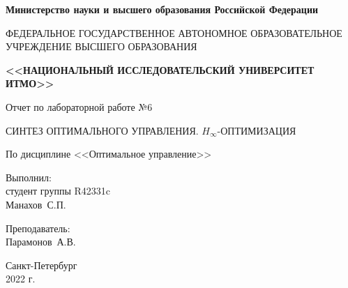 \begin{titlepage}
	\begin{center}
		\begin{small}
			\textbf{Министерство науки и высшего образования Российской Федерации}

			ФЕДЕРАЛЬНОЕ ГОСУДАРСТВЕННОЕ АВТОНОМНОЕ ОБРАЗОВАТЕЛЬНОЕ УЧРЕЖДЕНИЕ ВЫСШЕГО ОБРАЗОВАНИЯ
			
			\textbf{<<НАЦИОНАЛЬНЫЙ ИССЛЕДОВАТЕЛЬСКИЙ УНИВЕРСИТЕТ ИТМО>>}
		\end{small}
		
		\vspace{8em}
		
		Отчет по лабораторной работе №6
		
		СИНТЕЗ ОПТИМАЛЬНОГО УПРАВЛЕНИЯ. $H_\infty$-ОПТИМИЗАЦИЯ
		
		По дисциплине <<Оптимальное управление>>
	\end{center}
	
	\vspace{8em}
	
	\begin{flushright}
		Выполнил:\\
		студент группы R42331c\\
		Манахов~С.П.
		
		\vspace{1em}
		
		Преподаватель:\\
		Парамонов~А.В.
	\end{flushright}

	\vfill
	
	\begin{center}
		\small
		Санкт-Петербург\\
		2022 г.\\
	\end{center}
\end{titlepage}